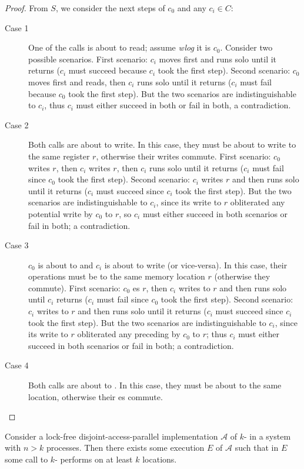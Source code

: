 \begin{proof}
From $S$, we consider the next steps of $c_0$ and any $c_i \in C$:

\begin{description}
\item[Case 1] One of the calls is about to read; assume \textit{wlog} it is $c_0$. Consider two possible scenarios. First scenario: $c_i$ moves first and runs solo until it returns ($c_i$ must succeed because $c_i$ took the first step). Second scenario: $c_0$ moves first and reads, then $c_i$ runs solo until it returns ($c_i$ must fail because $c_0$ took the first step). But the two scenarios are indistinguishable to $c_i$, thus $c_i$ must either succeed in both or fail in both, a contradiction.
\item[Case 2] Both calls are about to write. In this case, they must be about to write to the same register $r$, otherwise their writes commute. First scenario: $c_0$ writes $r$, then $c_i$ writes $r$, then $c_i$ runs solo until it returns ($c_i$ must fail since $c_0$ took the first step). Second scenario: $c_i$ writes $r$ and then runs solo until it returns ($c_i$ must succeed since $c_i$ took the first step). But the two scenarios are indistinguishable to $c_i$, since its write to $r$ obliterated any potential write by $c_0$ to $r$, so $c_i$ must either succeed in both scenarios or fail in both; a contradiction.
\item[Case 3] $c_0$ is about to \cas{} and $c_i$ is about to write (or vice-versa). In this case, their operations must be to the same memory location $r$ (otherwise they commute). First scenario: $c_0$ \cas{}es $r$, then $c_i$ writes to $r$ and then runs solo until $c_i$ returns ($c_i$ must fail since $c_0$ took the first step). Second scenario: $c_i$ writes to $r$ and then runs solo until it returns ($c_i$ must succeed since $c_i$ took the first step). But the two scenarios are indistinguishable to $c_i$, since its write to $r$ obliterated any preceding \cas{} by $c_0$ to $r$; thus $c_i$ must either succeed in both scenarios or fail in both; a contradiction.
\item[Case 4] Both calls are about to \cas{}. In this case, they must be about to \cas{} the same location, otherwise their \cas{}es commute. \qedhere
\end{description}
\end{proof}

\begin{theorem}
Consider a lock-free disjoint-access-parallel implementation $\mathcal{A}$ of $k$-\cas{} in a system with $n>k$ processes. Then there exists some execution $E$ of $\mathcal{A}$ such that in $E$ some call to $k$-\cas{} performs \cas{} on at least $k$ locations.
\end{theorem}

